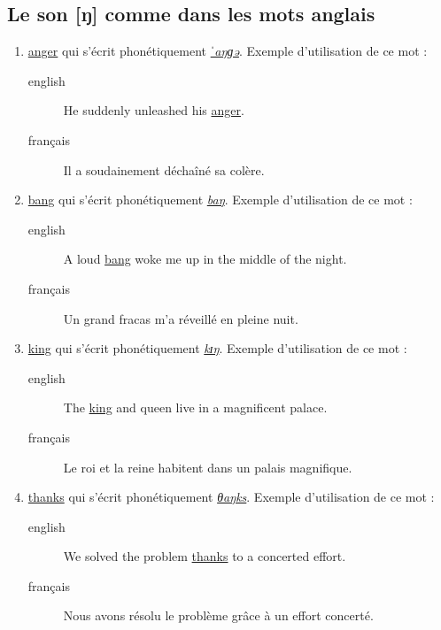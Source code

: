 \documentclass[12pt,a4paper]{book}
\begin{document}
\subsection{Le son [ŋ] comme dans les mots anglais}
\label{sec:org4b41268}
\begin{enumerate}
\item \href{http://www.wordreference.com/enfr/anger}{anger} qui s'écrit phonétiquement \href{https://en.oxforddictionaries.com/definition/anger}{\emph{ˈaŋɡə}}. Exemple d'utilisation de
ce mot : 
\begin{description}
\item[{english}] \textenglish{He suddenly unleashed his \href{https://youtu.be/lw64e7JVRj0}{anger}.}
\item[{français}] Il a soudainement déchaîné sa colère.
\end{description}
\item \href{http://www.wordreference.com/enfr/bang}{bang} qui s'écrit phonétiquement \href{https://en.oxforddictionaries.com/definition/bang}{\emph{baŋ}}. Exemple d'utilisation de ce
mot : 
\begin{description}
\item[{english}] \textenglish{A loud \href{https://youtu.be/N-AgYXz2n9Y}{bang} woke me up in the middle of the night.}
\item[{français}] Un grand fracas m'a réveillé en pleine nuit.
\end{description}
\item \href{http://www.wordreference.com/enfr/king}{king} qui s'écrit phonétiquement \href{https://en.oxforddictionaries.com/definition/king}{\emph{kɪŋ}}. Exemple d'utilisation de ce
mot : 
\begin{description}
\item[{english}] \textenglish{The \href{https://youtu.be/MRgFeZa\_I48}{king} and queen live in a magnificent palace.}
\item[{français}] Le roi et la reine habitent dans un palais magnifique.
\end{description}
\item \href{http://www.wordreference.com/enfr/thanks}{thanks} qui s'écrit phonétiquement \href{https://en.oxforddictionaries.com/definition/thanks}{\emph{θaŋks}}. Exemple d'utilisation de
ce mot :
\begin{description}
\item[{english}] \textenglish{We solved the problem \href{https://youtu.be/hQiipuDbbxw}{thanks} to a concerted effort.}
\item[{français}] Nous avons résolu le problème grâce à un effort
concerté.
\end{description}
\end{enumerate}
\end{document}
